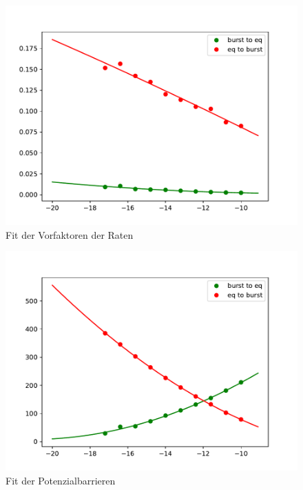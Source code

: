 \documentclass[12pt,a4paper]{article}
\begin{document}
\begin{figure}[H]
	\centering
	\includegraphics[scale=1]{raterinzelfit3.pdf}\caption{Fit der Vorfaktoren der Raten}
	\label{ratefit}
\end{figure}
\begin{figure}[H]
	\centering
	\includegraphics[scale=1]{barrierinzelfit3.pdf}\caption{Fit der Potenzialbarrieren}
	\label{barrierfit}
\end{figure}
\end{document}
